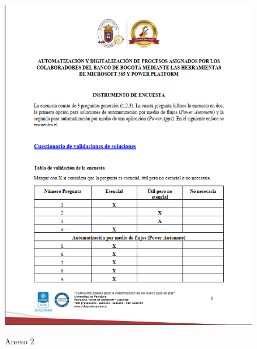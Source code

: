 \begin{figure}[H]
	\centering
	\includegraphics[scale=0.4]{Capitulo6/2}
	\label{anexo2}
	\caption{Anexo 2}
\end{figure}

